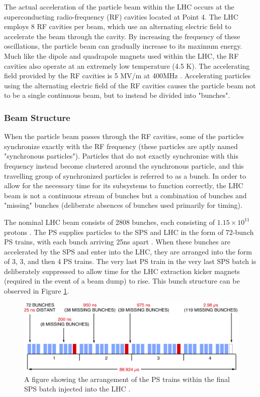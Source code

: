 \documentclass[12pt,a4paper,epsf,portrait,times,epsfig]{article}
\begin{document}
		The actual acceleration of the particle beam within the LHC occurs at the superconducting radio-frequency (RF) cavities located at Point 4. The LHC employs 8 RF cavities per beam, which use an alternating electric field to accelerate the beam through the cavity. By increasing the frequency of these oscillations, the particle beam can gradually increase to its maximum energy. Much like the dipole and quadrapole magnets used within the LHC, the RF cavities also operate at an extremely low temperature (4.5 K). The accelerating field provided by the RF cavities is 5 MV/m at 400MHz \cite{LHCRF}. Accelerating particles using the alternating electric field of the RF cavities causes the particle beam not to be a single continuous beam, but to instead be divided into "bunches".
		
		\subsubsection{Beam Structure}
		

		When the particle beam passes through the RF cavities, some of the particles synchronize exactly with the RF frequency (these particles are aptly named "synchronous particles"). Particles that do not exactly synchronize with this frequency instead become clustered around the synchronous particle, and this travelling group of synchronized particles is referred to as a bunch. In order to allow for the necessary time for its subsystems to function correctly, the LHC beam is not a continuous stream of bunches but a combination of bunches and "missing" bunches (deliberate absences of bunches used primarily for timing). \par

		The nominal LHC beam consists of 2808 bunches, each consisting of $1.15 \times 10^{11}$ protons \cite{LHCDesignV1,LHCDesignV3}. The PS supplies particles to the SPS and LHC in the form of 72-bunch PS trains, with each bunch arriving 25ns apart \cite{LHCBeam}. When these bunches are accelerated by the SPS and enter into the LHC, they are arranged into the form of 3, 3, and then 4 PS trains. The very last PS train in the very last SPS batch is deliberately suppressed to allow time for the LHC extraction kicker magnets (required in the event of a beam dump) to rise. This bunch structure can be observed in Figure \ref{Fig:LHCBunches}. 

		\begin{figure}
			\centering
			\includegraphics[scale=0.3]{LHC_Beam_Structure}
			\caption{A figure showing the arrangement of the PS trains within the final SPS batch injected into the LHC \cite{LHCBunches}.}
			\label{Fig:LHCBunches}
		\end{figure}
\end{document}
